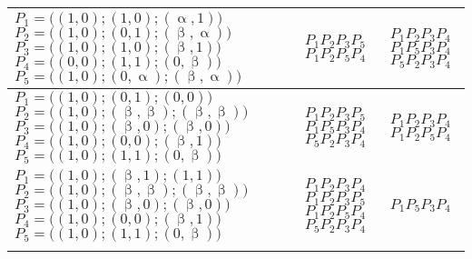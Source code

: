 \begin{table}[]
\begin{center}
\begin{tabular}{m{4.5cm}m{2.7cm}m{2.7cm}}
\midrule
$P_1 = \bigl((1,0);(1,0);(\upalpha,1)\bigr)$\newline
$P_2 = \bigl((1,0);(0,1);(\upbeta,\upalpha)\bigr)$\newline
$P_3 = \bigl((1,0);(1,0);(\upbeta,1)\bigr)$\newline
$P_4 = \bigl((0,0);(1,1);(0,\upbeta)\bigr)$\newline
$P_5 = \bigl((1,0);(0,\upalpha);(\upbeta,\upalpha)\bigr)$      &
                              $P_1P_2P_3P_5$\newline
                              $P_1P_2P_5P_4$&
                                              $P_1P_2P_3P_4$ \newline
                                              $P_1P_5P_3P_4$\newline
                                              $P_5P_2P_3P_4$\\
\midrule

$P_1 = \bigl((1,0);(0,1);(0,0)\bigr)$\newline
$P_2 = \bigl((1,0);(\upbeta,\upbeta);(\upbeta,\upbeta)\bigr)$\newline
$P_3 = \bigl((1,0);(\upbeta,0);(\upbeta,0)\bigr)$\newline
$P_4 = \bigl((1,0);(0,0);(\upbeta,1)\bigr)$\newline
$P_5 = \bigl((1,0);(1,1);(0,\upbeta)\bigr)$      &
                                  $P_1P_2P_3P_5$\newline
                                  $P_1P_5P_3P_4$\newline
                                  $P_5P_2P_3P_4$&
                                                          $P_1P_2P_3P_4$\newline
                                                          $P_1P_2P_5P_4$\\

\midrule
$P_1 = \bigl((1,0);(\upbeta,1);(1,1)\bigr)$\newline
$P_2 = \bigl((1,0);(\upbeta,\upbeta);(\upbeta,\upbeta)\bigr)$\newline
$P_3 = \bigl((1,0);(\upbeta,0);(\upbeta,0)\bigr)$\newline
$P_4 = \bigl((1,0);(0,0);(\upbeta,1)\bigr)$\newline
$P_5 = \bigl((1,0);(1,1);(0,\upbeta)\bigr)$      &
                                  $P_1P_2P_3P_4$\newline
                                  $P_1P_2P_3P_5$\newline
                                  $P_1P_2P_5P_4$\newline
                                  $P_5P_2P_3P_4$&
                                                            $P_1P_5P_3P_4$\\ \bottomrule\\
\end{tabular}
\end{center}
\end{table}
